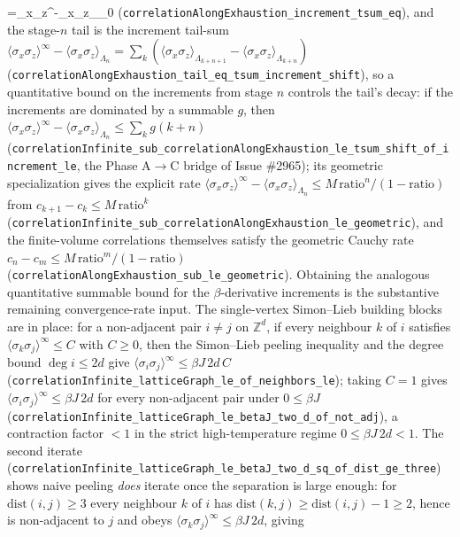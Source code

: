 \documentclass[a4paper,11pt]{article}
\begin{document}
=\langle\sigma_x\sigma_z\rangle^\infty-\langle\sigma_x\sigma_z\rangle_{\Lambda_0}\)
(\texttt{correlationAlongExhaustion\_increment\_tsum\_eq}), and the stage-\(n\)
tail is the increment tail-sum
\(\langle\sigma_x\sigma_z\rangle^\infty-\langle\sigma_x\sigma_z\rangle_{\Lambda_n}
=\sum_k(\langle\sigma_x\sigma_z\rangle_{\Lambda_{k+n+1}}-\langle\sigma_x\sigma_z\rangle_{\Lambda_{k+n}})\)
(\texttt{correlationAlongExhaustion\_tail\_eq\_tsum\_increment\_shift}), so a
quantitative bound on the increments from stage \(n\) controls the tail's decay:
if the increments are dominated by a summable \(g\), then
\(\langle\sigma_x\sigma_z\rangle^\infty-\langle\sigma_x\sigma_z\rangle_{\Lambda_n}
\le\sum_k g(k+n)\)
(\texttt{correlationInfinite\_sub\_correlationAlongExhaustion\_le\_tsum\_shift\_of\_increment\_le},
the Phase A\(\to\)C bridge of Issue \#2965); its geometric specialization gives the
explicit rate
\(\langle\sigma_x\sigma_z\rangle^\infty-\langle\sigma_x\sigma_z\rangle_{\Lambda_n}
\le M\,\mathrm{ratio}^n/(1-\mathrm{ratio})\) from
\(c_{k+1}-c_k\le M\,\mathrm{ratio}^k\)
(\texttt{correlationInfinite\_sub\_correlationAlongExhaustion\_le\_geometric}), and
the finite-volume correlations themselves satisfy the geometric Cauchy rate
\(c_n-c_m\le M\,\mathrm{ratio}^m/(1-\mathrm{ratio})\)
(\texttt{correlationAlongExhaustion\_sub\_le\_geometric}).
Obtaining the analogous quantitative summable bound for the \(\beta\)-derivative
increments is the substantive remaining convergence-rate input.  The
single-vertex Simon--Lieb building blocks are in place: for a non-adjacent pair
\(i\neq j\) on \(\mathbb{Z}^d\), if every neighbour \(k\) of \(i\) satisfies
\(\langle\sigma_k\sigma_j\rangle^\infty\le C\) with \(C\ge0\), then the
Simon--Lieb peeling inequality and the degree bound
\(\deg i\le 2d\) give \(\langle\sigma_i\sigma_j\rangle^\infty\le\beta J\,2d\,C\)
(\texttt{correlationInfinite\_latticeGraph\_le\_of\_neighbors\_le}); taking
\(C=1\) gives \(\langle\sigma_i\sigma_j\rangle^\infty\le\beta J\,2d\) for every
non-adjacent pair under \(0\le\beta J\)
(\texttt{correlationInfinite\_latticeGraph\_le\_betaJ\_two\_d\_of\_not\_adj}), a
contraction factor \(<1\) in the strict high-temperature regime
\(0\le\beta J\,2d<1\).  The second iterate
(\texttt{correlationInfinite\_latticeGraph\_le\_betaJ\_two\_d\_sq\_of\_dist\_ge\_three})
shows naive peeling \emph{does} iterate once the separation is large enough: for
\(\mathrm{dist}(i,j)\ge3\) every neighbour \(k\) of \(i\) has
\(\mathrm{dist}(k,j)\ge\mathrm{dist}(i,j)-1\ge2\), hence is non-adjacent to \(j\) and
obeys \(\langle\sigma_k\sigma_j\rangle^\infty\le\beta J\,2d\), giving
\end{document}

